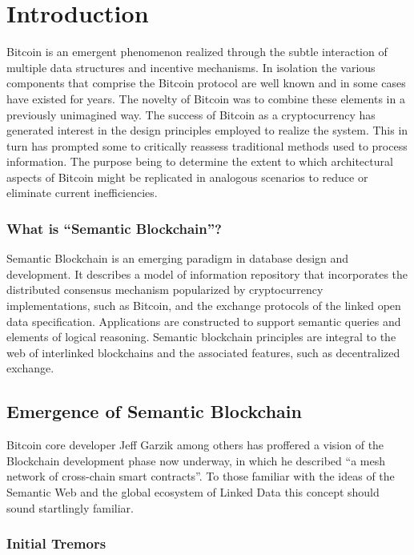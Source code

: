 \chapter{Introduction\label{cha:chapter1}}

Bitcoin is an emergent phenomenon realized through the subtle interaction of multiple data structures and incentive mechanisms. 
In isolation the various components that comprise the Bitcoin protocol are well known and in some cases have existed for years.
The novelty of Bitcoin was to combine these elements in a previously unimagined way. 
The success of Bitcoin as a cryptocurrency has generated interest in the design principles employed to realize the system.
This in turn has prompted some to critically reassess traditional methods used to process information. 
The purpose being to determine the extent to which architectural aspects of Bitcoin might be replicated in analogous scenarios to reduce or eliminate current inefficiencies. 

\subsection*{What is ``Semantic Blockchain''?}

Semantic Blockchain is an emerging paradigm in database design and development. 
It describes a model of information repository that incorporates the distributed consensus mechanism popularized by cryptocurrency implementations, such as Bitcoin, and the exchange protocols of the linked open data specification. 
Applications are constructed to support semantic queries and elements of logical reasoning. 
Semantic blockchain principles are integral to the web of interlinked blockchains and the associated features, such as decentralized exchange.

\section{Emergence of Semantic Blockchain}

Bitcoin core developer Jeff Garzik among others has proffered a vision of the Blockchain development phase now underway, in which he described ``a mesh network of cross-chain smart contracts''.
To those familiar with the ideas of the Semantic Web and the global ecosystem of Linked Data this concept should sound startlingly familiar.

\subsection*{Initial Tremors}

